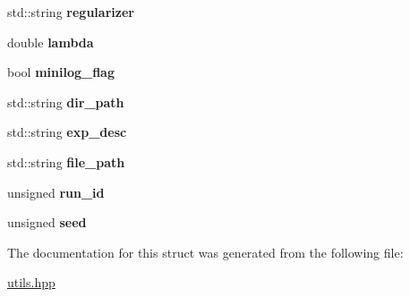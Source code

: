 \begin{DoxyCompactItemize}
\item 
\hypertarget{struct_params_a44ef27626e058f39bfa46a18a314eb0f}{}std\+::string {\bfseries regularizer}\label{struct_params_a44ef27626e058f39bfa46a18a314eb0f}

\item 
\hypertarget{struct_params_a3b185182fe39d3438ec461f9633b52c5}{}double {\bfseries lambda}\label{struct_params_a3b185182fe39d3438ec461f9633b52c5}

\item 
\hypertarget{struct_params_a0232026c0c0c395c0b1028f6129a97a5}{}bool {\bfseries minilog\+\_\+flag}\label{struct_params_a0232026c0c0c395c0b1028f6129a97a5}

\item 
\hypertarget{struct_params_ab5d70ea1f72a179aa3f50d6691ab3b1a}{}std\+::string {\bfseries dir\+\_\+path}\label{struct_params_ab5d70ea1f72a179aa3f50d6691ab3b1a}

\item 
\hypertarget{struct_params_aef14dda21219d65734adc08971102b0c}{}std\+::string {\bfseries exp\+\_\+desc}\label{struct_params_aef14dda21219d65734adc08971102b0c}

\item 
\hypertarget{struct_params_aaba0842db31c4079652abae6ef06b48d}{}std\+::string {\bfseries file\+\_\+path}\label{struct_params_aaba0842db31c4079652abae6ef06b48d}

\item 
\hypertarget{struct_params_ac583aa2ea2aa9d9c341cedbaf1bd583a}{}unsigned {\bfseries run\+\_\+id}\label{struct_params_ac583aa2ea2aa9d9c341cedbaf1bd583a}

\item 
\hypertarget{struct_params_aad6e1417ee38b5d4cc5ef879d4b463c5}{}unsigned {\bfseries seed}\label{struct_params_aad6e1417ee38b5d4cc5ef879d4b463c5}

\end{DoxyCompactItemize}


The documentation for this struct was generated from the following file\+:\begin{DoxyCompactItemize}
\item 
\hyperlink{utils_8hpp}{utils.\+hpp}\end{DoxyCompactItemize}
